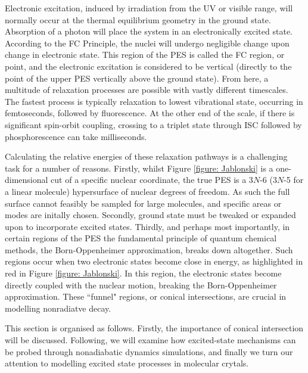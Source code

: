 Electronic excitation, induced by irradiation from the \ac{UV} or visible range, will normally occur at the thermal equilibrium geometry in the ground state. Absorption of a photon will place the system in an electronically excited state. According to the \ac{FC} Principle, the nuclei will undergo negligible change upon change in electronic state. This region of the \ac{PES} is called the \ac{FC} region, or point, and the electronic excitation is considered to be vertical (directly to the point of the upper \ac{PES} vertically above the ground state). From here, a multitude of relaxation processes are possible with vastly different timescales. The fastest process is typically relaxation to lowest vibrational state, occurring in femtoseconds, followed by fluorescence. At the other end of the scale, if there is significant spin-orbit coupling, crossing to a triplet state through \ac{ISC} followed by phosphorescence can take milliseconds. 

Calculating the relative energies of these relaxation pathways is a challenging task for a number of reasons. Firstly, whilst Figure \ref{figure: Jablonski} is a one-dimensional cut of a specific nuclear coordinate, the true \ac{PES} is a 3$N$-6 (3$N$-5 for a linear molecule) hypersurface of nuclear degrees of freedom. As such the full surface cannot feasibly be sampled for large molecules, and specific areas or modes are initally chosen. Secondly, ground state must be tweaked or expanded upon to incorporate excited states. Thirdly, and perhaps most importantly, in certain regions of the \ac{PES} the fundamental principle of quantum chemical methods, the Born-Oppenheimer approximation, breaks down altogether. Such regions occur when two electronic states become close in energy, as highlighted in red in Figure \ref{figure: Jablonski}. In this region, the electronic states become directly coupled with the nuclear motion, breaking the Born-Oppenheimer approximation. These ``funnel" regions, or conical intersections, are crucial in modelling nonradiatve decay.

This section is organised as follows. Firstly, the importance of conical intersection will be discussed. Following, we will examine how excited-state mechanisms can be probed through nonadiabatic dynamics simulations, and finally we turn our attention to modelling excited state processes in molecular crytals. 
